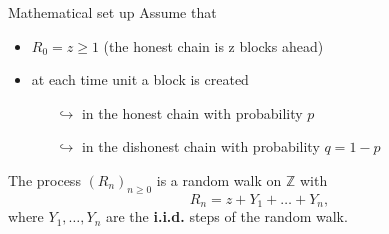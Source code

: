 \documentclass{beamer}
\begin{document}
\begin{frame}{Mathematical set up}
\scriptsize
Assume that
\begin{itemize}
\item $R_0=z\geq1$ (the honest chain is z blocks ahead)
\item at each time unit a block is created
\begin{itemize}
  \scriptsize
\item[$\hookrightarrow$] in the honest chain with probability $p$
\item[$\hookrightarrow$] in the dishonest chain with probability $q=1-p$
\end{itemize}
\end{itemize}
The process $(R_n)_{n\geq0}$ is a random walk on $\mathbb{Z}$ with
$$R_n=z+Y_1+\ldots+Y_n,$$
where $Y_1,\ldots,Y_n$ are the \textbf{i.i.d.} steps of the random walk. 

\end{frame}
\end{document}
